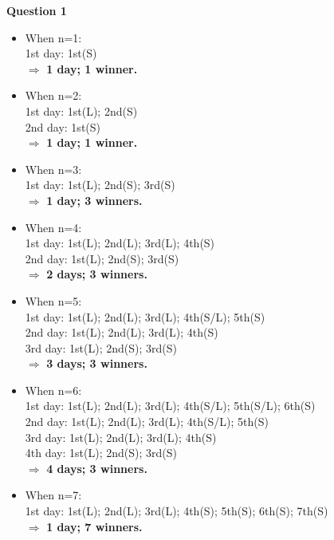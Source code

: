 \documentclass[12pt]{article}
\begin{document}
\textbf{Question 1}
\begin{itemize}
    \item When n=1:\\
    1st day: 1st(S) \\
    $\Longrightarrow$ \textbf{1 day; 1 winner.}
    
    \item When n=2:\\
    1st day: 1st(L); 2nd(S) \\
    2nd day: 1st(S) \\
    $\Longrightarrow$ \textbf{1 day; 1 winner.}
    
    \item When n=3:\\
    1st day: 1st(L); 2nd(S); 3rd(S) \\
    $\Longrightarrow$ \textbf{1 day; 3 winners.}\\
    
    \item When n=4:\\
    1st day: 1st(L); 2nd(L); 3rd(L); 4th(S) \\
    2nd day: 1st(L); 2nd(S); 3rd(S) \\
    $\Longrightarrow$ \textbf{2 days; 3 winners.}
    
    \item When n=5:\\
    1st day: 1st(L); 2nd(L); 3rd(L); 4th(S/L); 5th(S) \\
    2nd day: 1st(L); 2nd(L); 3rd(L); 4th(S) \\
    3rd day: 1st(L); 2nd(S); 3rd(S) \\
    $\Longrightarrow$ \textbf{3 days; 3 winners.}
    
    \item When n=6:\\
    1st day: 1st(L); 2nd(L); 3rd(L); 4th(S/L); 5th(S/L); 6th(S) \\
    2nd day: 1st(L); 2nd(L); 3rd(L); 4th(S/L); 5th(S) \\
    3rd day: 1st(L); 2nd(L); 3rd(L); 4th(S) \\
    4th day: 1st(L); 2nd(S); 3rd(S) \\
    $\Longrightarrow$ \textbf{4 days; 3 winners.}
    
    \item When n=7:\\
    1st day: 1st(L); 2nd(L); 3rd(L); 4th(S); 5th(S); 6th(S); 7th(S) \\
    $\Longrightarrow$ \textbf{1 day; 7 winners.}\\
    

\end{itemize}
\end{document}
